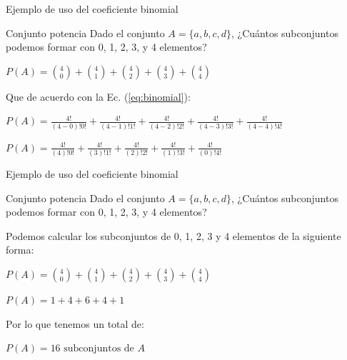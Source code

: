 \documentclass{beamer}
\begin{document}
\begin{frame}{Ejemplo de uso del coeficiente binomial}
  \begin{exampleblock}{Conjunto potencia}
Dado el conjunto $A =\{a,b,c,d\}$, ¿Cu\'antos subconjuntos podemos formar con
0, 1, 2, 3, y 4 elementos?
  \end{exampleblock}
  \begin{exampleblock}{}
    \centering
    $ P(A) = \binom{4}{0} + \binom{4}{1} + \binom{4}{2} + \binom{4}{3} + \binom{4}{4} $
  \end{exampleblock}
  Que de acuerdo con la Ec. (\ref{eq:binomial}):

  \begin{exampleblock}{}
    \centering
  $ P(A) = \frac{4!}{(4-0)!0!} + \frac{4!}{(4-1)!1!} + \frac{4!}{(4-2)!2!} + \frac{4!}{(4-3)!3!} + \frac{4!}{(4-4)!4!} $
  \end{exampleblock}
  \begin{exampleblock}{}
    \centering
  $ P(A) = \frac{4!}{(4)!0!} + \frac{4!}{(3)!1!} + \frac{4!}{(2)!2!} + \frac{4!}{(1)!3!} + \frac{4!}{(0)!4!} $
  \end{exampleblock}

\end{frame}

\begin{frame}{Ejemplo de uso del coeficiente binomial}

  \begin{exampleblock}{Conjunto potencia}
    Dado el conjunto $A =\{a,b,c,d\}$, ¿Cu\'antos subconjuntos podemos formar con 0,
    1, 2, 3, y 4 elementos?
  \end{exampleblock}
  
  Podemos calcular los subconjuntos de 0, 1, 2, 3 y 4 elementos de la siguiente
  forma:

  \begin{exampleblock}{}
    \centering
    $ P(A) = \binom{4}{0} + \binom{4}{1} + \binom{4}{2} + \binom{4}{3} + \binom{4}{4} $
  \end{exampleblock}
  \begin{exampleblock}{}
    \centering
    $ P(A) = 1 + 4 + 6 + 4 + 1 $
  \end{exampleblock}
  Por lo que tenemos un total de:
  \begin{exampleblock}{}
    \centering
    $ P(A) = 16 \text{ subconjuntos de } A$
  \end{exampleblock}

\end{frame}
\end{document}
